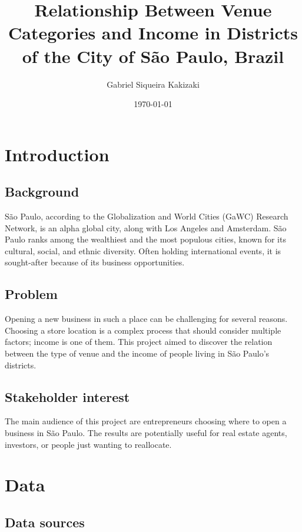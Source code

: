 \documentclass[12pt]{article}
\author{Gabriel Siqueira Kakizaki}
\date{\today}
\title{\textbf{Relationship Between Venue Categories and Income in Districts of
the City of São Paulo, Brazil}}
\begin{document}
\maketitle



\section{Introduction}

\subsection{Background}

São Paulo, according to the Globalization and World Cities (GaWC) Research Network, is an alpha global city, along with Los Angeles and Amsterdam. São Paulo ranks among the wealthiest and the most populous cities, known for its cultural, social, and ethnic diversity. Often holding international events, it is sought-after because of its business opportunities.


\subsection{Problem}

Opening a new business in such a place can be challenging for several reasons. Choosing a store location is a complex process that should consider multiple factors; income is one of them. This project aimed to discover the relation between the type of venue and the income of people living in São Paulo's districts.


\subsection{Stakeholder interest}

The main audience of this project are entrepreneurs choosing where to open a business in São Paulo. The results are potentially useful for real estate agents, investors, or people just wanting to reallocate.


\section{Data}

\subsection{Data sources}
\end{document}
